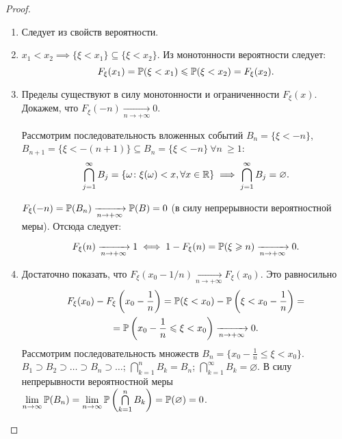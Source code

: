 \begin{proof}
\begin{enumerate}
    \item 
        Следует из свойств вероятности.
    \item 
        $x_1 < x_2 \implies \{\xi < x_1 \} \subseteq \{\xi < x_2\}$. Из монотонности вероятности следует:
        \begin{equation*}
            F_\xi(x_1) = \operatorname{\mathbb{P}}(\xi < x_1) \leqslant \operatorname{\mathbb{P}}(\xi < x_2) = F_\xi(x_2).
        \end{equation*}
    \item 
        Пределы существуют в силу монотонности и ограниченности $F_\xi(x)$. 
        Докажем, что $F_\xi(-n) \xrightarrow[n \to +\infty]{} 0$.
        
        Рассмотрим последовательность вложенных событий 
        $B_n = \{\xi < -n \}$, 
        $B_{n+1} = \{\xi < -(n+1) \} \subseteq B_n = \{\xi < -n \} ~ \forall n ~ \geqslant 1$:
        \begin{equation*}
            \bigcap\limits_{j = 1}^{\infty}B_j = \{\omega \colon \xi(\omega) < x, \forall x \in \mathbb{R} \} \implies \bigcap\limits_{j = 1}^{\infty}B_j = \varnothing.
        \end{equation*}
    
        $F_\xi(-n) = \operatorname{\mathbb{P}}(B_n) \xrightarrow[n \to +\infty]{} \operatorname{\mathbb{P}}(B) = 0$ (в силу непрерывности вероятностной меры). Отсюда следует: 
        
        \begin{equation*}
            F_\xi(n) \xrightarrow[n \to +\infty]{} 1 \iff 1 - F_\xi(n) = \operatorname{\mathbb{P}}(\xi \geqslant n) \xrightarrow[n \to +\infty]{} 0.
        \end{equation*}
        
    \item
        Достаточно показать, что $F_\xi(x_0 - 1/n) \xrightarrow[n \to +\infty]{} F_\xi(x_0)$. 
        Это равносильно 
        \begin{multline*}
            F_\xi(x_0) - F_\xi \left(x_0 - \frac{1}{n} \right) 
            = \operatorname{\mathbb{P}}(\xi < x_0) - \operatorname{\mathbb{P}}\left( \xi < x_0 - \frac{1}{n} \right) = \\ 
            = \operatorname{\mathbb{P}}\left( x_0 - \frac{1}{n} \leqslant \xi < x_0 \right) \xrightarrow[n \to +\infty]{} 0.
        \end{multline*}
        Рассмотрим последовательность множеств $B_n = \{ x_0 - \frac{1}{n} \leqslant \xi < x_0 \} $. 
        ${B_1 \supset B_2 \supset \ldots \supset B_n \supset \ldots}$; 
        $\bigcap\limits_{k=1}^{n}B_k = B_n$;
        $\bigcap\limits_{k=1}^{\infty}B_k = \varnothing$.
        В силу непрерывности вероятностной меры 
        $\lim\limits_{n \to \infty} \operatorname{\mathbb{P}}(B_n) = 
        \lim\limits_{n \to \infty} \operatorname{\mathbb{P}}\left( \bigcap\limits_{k=1}^{n}B_k \right) = 
        \operatorname{\mathbb{P}}(\varnothing) = 0$.
\end{enumerate}
\end{proof}

